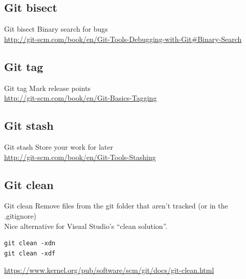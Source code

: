 \documentclass[10pt,a4paper]{beamer}
\begin{document}
\subsection{Git bisect}
\begin{frame}{Git bisect}
Binary search for bugs \\
\href{http://git-scm.com/book/en/Git-Tools-Debugging-with-Git\#Binary-Search}{\color{blue}http://git-scm.com/book/en/Git-Tools-Debugging-with-Git\#Binary-Search}
\end{frame}

\subsection{Git tag}
\begin{frame}{Git tag}
Mark release points \\
\href{http://git-scm.com/book/en/Git-Basics-Tagging}{\color{blue}http://git-scm.com/book/en/Git-Basics-Tagging}
\end{frame}

\subsection{Git stash}
\begin{frame}{Git stash}
Store your work for later \\
\href{http://git-scm.com/book/en/Git-Tools-Stashing}{\color{blue}http://git-scm.com/book/en/Git-Tools-Stashing}
\end{frame}

\subsection{Git clean}
\begin{frame}[fragile]{Git clean}
Remove files from the git folder that aren't tracked (or in the .gitignore) \\
Nice alternative for Visual Studio's ``clean solution''. \\
\begin{verbatim}
git clean -xdn
git clean -xdf
\end{verbatim}
\href{https://www.kernel.org/pub/software/scm/git/docs/git-clean.html}{\color{blue}https://www.kernel.org/pub/software/scm/git/docs/git-clean.html}
\end{frame}
\end{document}
